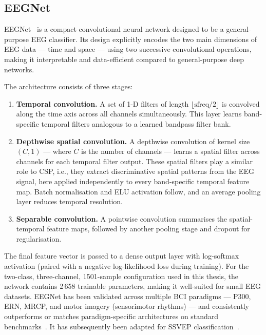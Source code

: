 \documentclass[english, bc, kiv, he, iso690alph, pdf]{fasthesis}
\begin{document}
\subsection{EEGNet}

EEGNet~\cite{lawhern2018eegnet} is a compact convolutional neural network designed to be a general-purpose EEG classifier. Its design explicitly encodes the two main dimensions of EEG data — time and space — using two successive convolutional operations, making it interpretable and data-efficient compared to general-purpose deep networks.

The architecture consists of three stages:

\begin{enumerate}
    \item \textbf{Temporal convolution.} A set of 1-D filters of length $\lfloor \text{sfreq}/2 \rfloor$ is convolved along the time axis across all channels simultaneously. This layer learns band-specific temporal filters analogous to a learned bandpass filter bank.
    \item \textbf{Depthwise spatial convolution.} A depthwise convolution of kernel size $(C, 1)$ — where $C$ is the number of channels — learns a spatial filter across channels for each temporal filter output. These spatial filters play a similar role to CSP, i.e., they extract discriminative spatial patterns from the EEG signal, here applied independently to every band-specific temporal feature map. Batch normalisation and ELU activation follow, and an average pooling layer reduces temporal resolution.
    \item \textbf{Separable convolution.} A pointwise convolution summarises the spatial-temporal feature maps, followed by another pooling stage and dropout for regularisation.
\end{enumerate}

The final feature vector is passed to a dense output layer with log-softmax activation (paired with a negative log-likelihood loss during training). For the two-class, three-channel, 1501-sample configuration used in this thesis, the network contains 2\,658 trainable parameters, making it well-suited for small EEG datasets. EEGNet has been validated across multiple BCI paradigms — P300, ERN, MRCP, and motor imagery (sensorimotor rhythms) — and consistently outperforms or matches paradigm-specific architectures on standard benchmarks~\cite{lawhern2018eegnet}. It has subsequently been adapted for SSVEP classification~\cite{waytowich2018compactcnn}.
\end{document}
